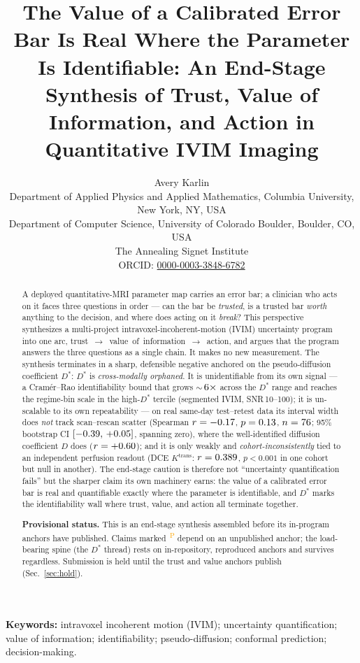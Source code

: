 \documentclass[11pt]{article}
\title{\textbf{The Value of a Calibrated Error Bar Is Real Where the Parameter Is
Identifiable: An End-Stage Synthesis of Trust, Value of Information, and Action in
Quantitative IVIM Imaging}}
\author{Avery Karlin\\[3pt]                                  %
\small Department of Applied Physics and Applied Mathematics, Columbia University, New York, NY, USA\\[1pt]
\small Department of Computer Science, University of Colorado Boulder, Boulder, CO, USA\\[1pt]
\small The Annealing Signet Institute\\[3pt]
\small ORCID: \href{https://orcid.org/0000-0003-3848-6782}{0000-0003-3848-6782}}
\date{}
\newcommand{\Dstar}{D^{*}}
\newcommand{\PROV}{\textsuperscript{\textcolor{orange}{\,P}}}
\begin{document}
\maketitle

\begin{abstract}
\noindent
A deployed quantitative-MRI parameter map carries an error bar; a clinician who acts on it
faces three questions in order --- can the bar be \emph{trusted}, is a trusted bar
\emph{worth} anything to the decision, and where does acting on it \emph{break}? This
perspective synthesizes a multi-project intravoxel-incoherent-motion (IVIM) uncertainty
program into one arc, \mbox{trust $\rightarrow$ value of information $\rightarrow$ action},
and argues that the program answers the three questions as a single chain. It makes no new
measurement. The synthesis terminates in a sharp, defensible negative anchored on the
pseudo-diffusion coefficient $\Dstar$: $\Dstar$ is \emph{cross-modally orphaned}. It is
unidentifiable from its own signal --- a Cram\'er--Rao identifiability bound that grows
$\sim$\,$6\times$ across the $\Dstar$ range and reaches the regime-bin scale in
the high-$\Dstar$ tercile (segmented IVIM, SNR\,10--100); it is un-scalable to its own
repeatability --- on real same-day test--retest data its interval width does \emph{not} track
scan--rescan scatter (Spearman $r=-0.17$, $p=0.13$, $n=76$; 95\% bootstrap
CI $[-0.39,\,+0.05]$, spanning zero), where the well-identified diffusion
coefficient $D$ does ($r=+0.60$); and it is only weakly and \emph{cohort-inconsistently}
tied to an independent perfusion readout (DCE $K^{\mathrm{trans}}$: $r=0.389$, $p<0.001$ in
one cohort but null in another). The end-stage caution is therefore not ``uncertainty
quantification fails'' but the sharper claim its own machinery earns: the value of a calibrated
error bar is real and quantifiable exactly where the parameter is identifiable, and $\Dstar$
marks the identifiability wall where trust, value, and action all terminate together.

\medskip
\noindent\textbf{Provisional status.} This is an end-stage synthesis assembled before its
in-program anchors have published. Claims marked \PROV{} depend on an unpublished anchor; the
load-bearing spine (the $\Dstar$ thread) rests on in-repository, reproduced anchors and survives
regardless. Submission is held until the trust and value anchors publish (Sec.~\ref{sec:hold}).
\end{abstract}

\vspace{0.4em}
\noindent\textbf{Keywords:} intravoxel incoherent motion (IVIM); uncertainty quantification;
value of information; identifiability; pseudo-diffusion; conformal prediction; decision-making.
\end{document}
